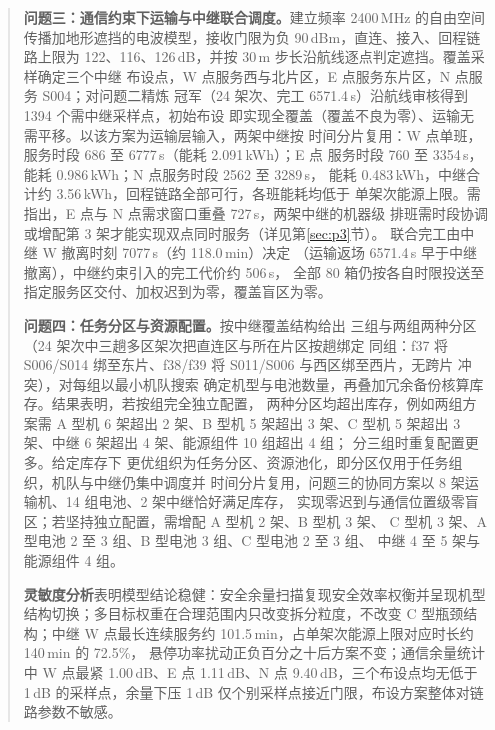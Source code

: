 \documentclass[bwprint]{gmcmthesis}
\begin{document}
\begin{abstract}
\textbf{问题三：通信约束下运输与中继联合调度。}建立频率 2400\,MHz 的自由空间
传播加地形遮挡的电波模型，接收门限为负 90\,dBm，直连、接入、回程链路上限为
122、116、126\,dB，并按 30\,m 步长沿航线逐点判定遮挡。覆盖采样确定三个中继
布设点，W 点服务西与北片区，E 点服务东片区，N 点服务 S004；对问题二精炼
冠军（24 架次、完工 6571.4\,s）沿航线审核得到 1394 个需中继采样点，初始布设
即实现全覆盖（覆盖不良为零）、运输无需平移。以该方案为运输层输入，两架中继按
时间分片复用：W 点单班，服务时段 686 至 6777\,s（能耗 2.091\,kWh）；E 点
服务时段 760 至 3354\,s，能耗 0.986\,kWh；N 点服务时段 2562 至 3289\,s，
能耗 0.483\,kWh，中继合计约 3.56\,kWh，回程链路全部可行，各班能耗均低于
单架次能源上限。需指出，E 点与 N 点需求窗口重叠 727\,s，两架中继的机器级
排班需时段协调或增配第 3 架才能实现双点同时服务（详见第\ref{sec:p3}节）。
联合完工由中继 W 撤离时刻 7077\,s（约 118.0\,min）决定
（运输返场 6571.4\,s 早于中继撤离），中继约束引入的完工代价约 506\,s，
全部 80 箱仍按各自时限投送至指定服务区交付、加权迟到为零，覆盖盲区为零。

\textbf{问题四：任务分区与资源配置。}按中继覆盖结构给出
三组与两组两种分区（24 架次中三趟多区架次把直连区与所在片区按趟绑定
同组：f37 将 S006/S014 绑至东片、f38/f39 将 S011/S006 与西区绑至西片，无跨片
冲突），对每组以最小机队搜索
确定机型与电池数量，再叠加冗余备份核算库存。结果表明，若按组完全独立配置，
两种分区均超出库存，例如两组方案需 A 型机 6 架超出 2 架、B 型机 5 架超出
3 架、C 型机 5 架超出 3 架、中继 6 架超出 4 架、能源组件 10 组超出 4 组；
分三组时重复配置更多。给定库存下
更优组织为任务分区、资源池化，即分区仅用于任务组织，机队与中继仍集中调度并
时间分片复用，问题三的协同方案以 8 架运输机、14 组电池、2 架中继恰好满足库存，
实现零迟到与通信位置级零盲区；若坚持独立配置，需增配 A 型机 2 架、B 型机 3 架、
C 型机 3 架、A 型电池 2 至 3 组、B 型电池 3 组、C 型电池 2 至 3 组、
中继 4 至 5 架与能源组件 4 组。

\textbf{灵敏度分析}表明模型结论稳健：安全余量扫描复现安全效率权衡并呈现机型
结构切换；多目标权重在合理范围内只改变拆分粒度，不改变 C 型瓶颈结构；中继
W 点最长连续服务约 101.5\,min，占单架次能源上限对应时长约 140\,min 的 72.5\%，
悬停功率扰动正负百分之十后方案不变；通信余量统计中 W 点最紧 1.00\,dB、E 点
1.11\,dB、N 点 9.40\,dB，三个布设点均无低于 1\,dB 的采样点，余量下压 1\,dB
仅个别采样点接近门限，布设方案整体对链路参数不敏感。

\end{abstract}

\pagestyle{plain}
\end{document}
